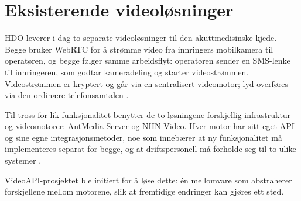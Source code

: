 \section{Eksisterende videoløsninger}
\label{sec:eksisterende-videolosninger}

HDO leverer i dag to separate videoløsninger til den 
akuttmedisinske kjede. Begge bruker WebRTC for å strømme 
video fra innringers mobilkamera til operatøren, og begge 
følger samme arbeidsflyt: operatøren sender en SMS-lenke 
til innringeren, som godtar kameradeling og starter 
videostrømmen. Videostrømmen er kryptert og går via en 
sentralisert videomotor; lyd overføres via den ordinære 
telefonsamtalen \cite{hdo_oppgave}.

Til tross for lik funksjonalitet benytter de to løsningene 
forskjellig infrastruktur og videomotorer: AntMedia Server 
og NHN Video. Hver motor har sitt eget API og sine egne 
integrasjonsmetoder, noe som innebærer at ny funksjonalitet 
må implementeres separat for begge, og at driftspersonell 
må forholde seg til to ulike systemer \cite{hdo_oppgave}.

VideoAPI-prosjektet ble initiert for å løse dette: én 
mellomvare som abstraherer forskjellene mellom motorene, 
slik at fremtidige endringer kan gjøres ett sted.